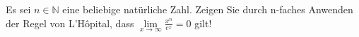 \item
Es sei $n\in \mathbb{N}$ eine beliebige natürliche Zahl. Zeigen Sie durch n-faches Anwenden der Regel von L'Hôpital, dass $\lim\limits_{x\to\infty}\frac{x^n}{e^x} = 0$ gilt!


